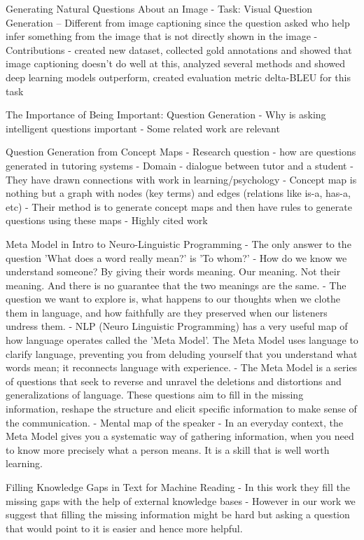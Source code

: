 \documentclass[11pt]{article}
\begin{document}
Generating Natural Questions About an Image 
- Task: Visual Question Generation -- Different from image captioning since the question asked who help infer something from the image that is not directly shown in the image
- Contributions - created new dataset, collected gold annotations and showed that image captioning doesn't do well at this, analyzed several methods and showed deep learning models outperform, created evaluation metric delta-BLEU for this task
			
The Importance of Being Important: Question Generation 
- Why is asking intelligent questions important
- Some related work are relevant

Question Generation from Concept Maps
- Research question - how are questions generated in tutoring systems
- Domain - dialogue between tutor and a student
- They have drawn connections with work in learning/psychology
- Concept map is nothing but a graph with nodes (key terms) and edges (relations like is-a, has-a, etc)
- Their method is to generate concept maps and then have rules to generate questions using these maps
- Highly cited work

Meta Model in Intro to Neuro-Linguistic Programming
- The only answer to the question 'What does a word really mean?' is 'To whom?'
- How do we know we understand someone? By giving their words meaning. Our meaning. Not  their meaning. And there is no guarantee that the two meanings are the same.
- The question we want to explore is, what happens to our thoughts when we clothe them in language, and how faithfully are they preserved when our listeners undress them.
- NLP (Neuro Linguistic Programming) has a very useful map of how language operates called the 'Meta Model'. The Meta Model uses language to clarify language, preventing you from deluding yourself that you understand what words mean; it reconnects language with experience.
- The Meta Model is a series of questions that seek to reverse and unravel the deletions and distortions and generalizations of language. These questions aim to fill in the missing information, reshape the structure and elicit specific information to make sense of the communication.
- Mental map of the speaker
- In an everyday context, the Meta Model gives you a systematic way of gathering information, when you need to know more precisely what a person means. It is a skill that is well worth learning.

Filling Knowledge Gaps in Text for Machine Reading
- In this work they fill the missing gaps with the help of external knowledge bases
- However in our work we suggest that filling the missing information might be hard but asking a question that would point to it is easier and hence more helpful.
\end{document}
